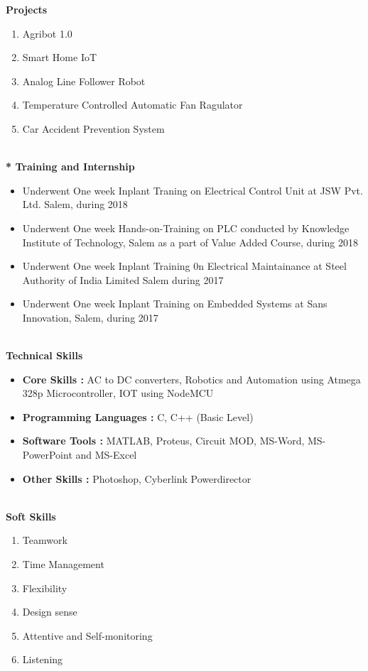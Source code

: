 \documentclass{article}
\begin{document}
	\Large \textbf{Projects}
\begin{enumerate}
	\item Agribot 1.0
	\item Smart Home IoT
	\item Analog Line Follower Robot
	\item Temperature Controlled Automatic Fan Ragulator
	\item Car Accident Prevention System
\end{enumerate}

\Large \textbf{\\* Training and Internship}\

\begin{itemize}
	\item Underwent One week Inplant Traning on Electrical Control Unit at JSW Pvt. Ltd. Salem, during 2018
	\item Underwent One week Hands-on-Training on PLC conducted by Knowledge Institute of Technology, Salem as a part of Value Added Course, during 2018 
	\item Underwent One week Inplant Training 0n Electrical Maintainance at Steel Authority of India Limited Salem during 2017
	\item Underwent One week Inplant Training on Embedded Systems at Sans Innovation, Salem, during 2017 
\end{itemize}

\Large \textbf{\\Technical Skills}\
\begin{itemize}
	\item \textbf{Core Skills	:} AC to DC converters,	Robotics and Automation using Atmega 328p Microcontroller, IOT using NodeMCU
	\item \textbf{Programming Languages	:}	C, C++ (Basic Level)
	\item \textbf{Software Tools	:}	MATLAB, Proteus, Circuit MOD, MS-Word, MS-PowerPoint and MS-Excel
	\item \textbf{Other Skills	:} Photoshop, Cyberlink Powerdirector
\end{itemize}

\Large \textbf{\\Soft Skills}\
\begin{enumerate}
	\item Teamwork
	\item Time Management
	\item Flexibility
	\item Design sense
	\item Attentive and Self-monitoring
	\item Listening
\end{enumerate}
\end{document}
